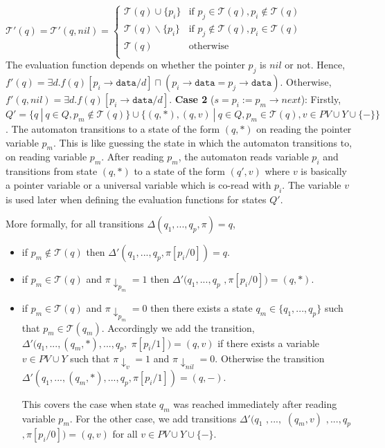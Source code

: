 \documentclass{llncs}
\newcommand{\data}{\texttt{data}}
\begin{document}
$\mathcal{T'}(q) = \mathcal{T'}(q, nil)= \begin{cases}
        \mathcal{T}(q) \cup \{p_i\} & \text{if $p_j \in \mathcal{T}(q), p_i \notin \mathcal{T}(q)$ }\\
	  \mathcal{T}(q) \backslash \{p_i\} & \text{if $p_j \notin \mathcal{T}(q), p_i \in \mathcal{T}(q)$ }\\
	  \mathcal{T}(q) & \text{otherwise}\\
      \end{cases}
$\\
The evaluation function depends on whether the pointer $p_j$ is $nil$ or not. 
Hence, $f'(q) = \exists d. f(q)[p_i\rightarrow\data/d] \sqcap (p_i\rightarrow\data = p_j\rightarrow\data)$. Otherwise, $f'(q, nil) = \exists d. f(q)[p_i\rightarrow\data/d]$.
\newline\newline
{\bf Case 2} ($s = p_i := p_m \rightarrow next$): Firstly, $Q' = \{q~|~ q \in Q, p_m \notin \mathcal{T}(q) \} \cup \{(q,*), (q, v)~|~q \in Q, p_m \in \mathcal{T}(q), v \in PV \cup Y \cup \{-\}\}$. The automaton transitions to a state of the form $(q,*)$ on reading the pointer variable $p_m$. This is like guessing the state in which the automaton transitions to, on reading variable $p_m$. After reading $p_m$, the automaton
reads variable $p_i$ and transitions from state $(q,*)$ to a state of the form $(q',v)$ where $v$ is basically a pointer variable or a universal variable which is co-read with $p_i$. The variable $v$ is used later when defining the evaluation functions for states $Q'$. 


More formally, for all transitions $\Delta(q_1, ..., q_p,\pi) = q$,
\begin{itemize}
\item if $p_m \notin \mathcal{T}(q)$ then $\Delta'(q_1, ..., q_p, \pi[p_i/0]) =  q$.
\item if $p_m \in \mathcal{T}(q)$ and $\pi \downarrow_{p_m} = 1$ then $\Delta'(q_1, ..., q_p$ $, \pi[p_i/0]) = (q,*)$.
\item if $p_m \in \mathcal{T}(q)$ and $\pi \downarrow_{p_m} = 0$ then there exists a state $q_m \in \{q_1, ..., q_p\}$ such that $p_m \in \mathcal{T}(q_m)$. 
Accordingly we add the transition, $\Delta'(q_1, ..., (q_m,*), ..., q_p,$ $\pi[p_i/1]) = (q,v)$ if there exists a variable $v \in PV \cup Y$ such that $\pi \downarrow_{v} = 1$ and $\pi \downarrow_{nil} = 0$. Otherwise the transition  $\Delta'(q_1, ..., (q_m,*), ..., q_p, \pi[p_i/1]) = (q,-)$.

This covers the case when state $q_m$ was reached immediately after reading variable $p_m$. For the other case, we add transitions 
$\Delta'(q_1$ $, ...,$ $(q_m,v)$ $, ..., q_p$ $, \pi[p_i/0]) = (q,v)$ for all $v \in PV \cup Y \cup \{-\}$.
\end{itemize}
\end{document}
